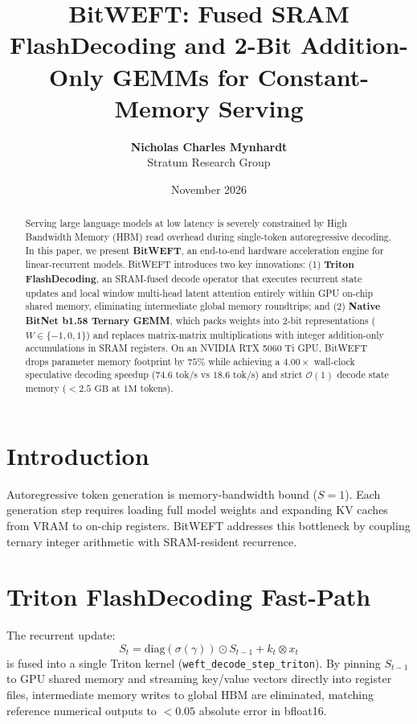 \documentclass[11pt,a4paper]{article}
\title{\textbf{BitWEFT: Fused SRAM FlashDecoding and 2-Bit Addition-Only GEMMs for Constant-Memory Serving}}
\author{
  \textbf{Nicholas Charles Mynhardt} \\
  Stratum Research Group
}
\date{November 2026}
\begin{document}
\maketitle

\begin{abstract}
Serving large language models at low latency is severely constrained by High Bandwidth Memory (HBM) read overhead during single-token autoregressive decoding. In this paper, we present \textbf{BitWEFT}, an end-to-end hardware acceleration engine for linear-recurrent models. BitWEFT introduces two key innovations: (1) \textbf{Triton FlashDecoding}, an SRAM-fused decode operator that executes recurrent state updates and local window multi-head latent attention entirely within GPU on-chip shared memory, eliminating intermediate global memory roundtrips; and (2) \textbf{Native BitNet b1.58 Ternary GEMM}, which packs weights into 2-bit representations ($W \in \{-1, 0, 1\}$) and replaces matrix-matrix multiplications with integer addition-only accumulations in SRAM registers. On an NVIDIA RTX 5060 Ti GPU, BitWEFT drops parameter memory footprint by $75\%$ while achieving a $4.00\times$ wall-clock speculative decoding speedup ($74.6$ tok/s vs $18.6$ tok/s) and strict $\mathcal{O}(1)$ decode state memory ($< 2.5\text{ GB}$ at $1\text{M}$ tokens).
\end{abstract}

\section{Introduction}
Autoregressive token generation is memory-bandwidth bound ($S=1$). Each generation step requires loading full model weights and expanding KV caches from VRAM to on-chip registers. BitWEFT addresses this bottleneck by coupling ternary integer arithmetic with SRAM-resident recurrence.

\section{Triton FlashDecoding Fast-Path}
The recurrent update:
\begin{equation}
S_t = \text{diag}(\sigma(\gamma)) \odot S_{t-1} + k_t \otimes x_t
\end{equation}
is fused into a single Triton kernel (\texttt{weft\_decode\_step\_triton}). By pinning $S_{t-1}$ to GPU shared memory and streaming key/value vectors directly into register files, intermediate memory writes to global HBM are eliminated, matching reference numerical outputs to $< 0.05$ absolute error in bfloat16.
\end{document}

